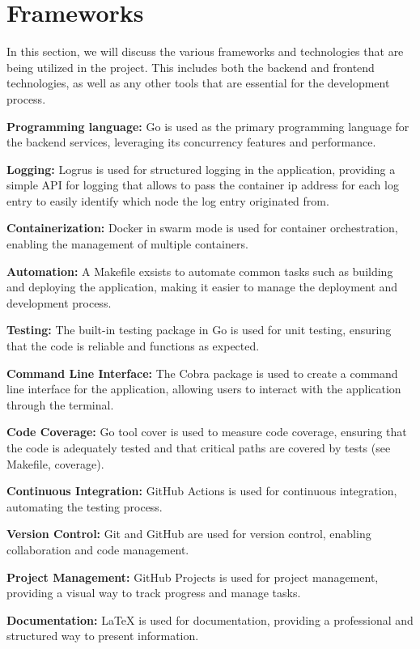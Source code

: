 
\section{Frameworks}
In this section, we will discuss the various frameworks and technologies that are being utilized in the project. This includes both the backend and frontend technologies, as well as any other tools that are essential for the development process.

\begin{list}{}
    \item \textbf{Programming language:} Go is used as the primary programming language for the backend services, leveraging its concurrency features and performance.
    \item \textbf{Logging:} Logrus is used for structured logging in the application, providing a simple API for logging that allows to pass the container ip address for each log entry to easily identify which node the log entry originated from.
    \item \textbf{Containerization:} Docker in swarm mode is used for container orchestration, enabling the management of multiple containers.
    \item \textbf{Automation:} A Makefile exsists to automate common tasks such as building and deploying the application, making it easier to manage the deployment and development process.
    \item \textbf{Testing:} The built-in testing package in Go is used for unit testing, ensuring that the code is reliable and functions as expected.
    \item \textbf{Command Line Interface:} The Cobra package is used to create a command line interface for the application, allowing users to interact with the application through the terminal.
    \item \textbf{Code Coverage:} Go tool cover is used to measure code coverage, ensuring that the code is adequately tested and that critical paths are covered by tests (see Makefile, coverage).
    \item \textbf{Continuous Integration:} GitHub Actions is used for continuous integration, automating the testing process.
    \item \textbf{Version Control:} Git and GitHub are used for version control, enabling collaboration and code management.
    \item \textbf{Project Management:} GitHub Projects is used for project management, providing a visual way to track progress and manage tasks.
    \item \textbf{Documentation:} LaTeX is used for documentation, providing a professional and structured way to present information.
\end{list}